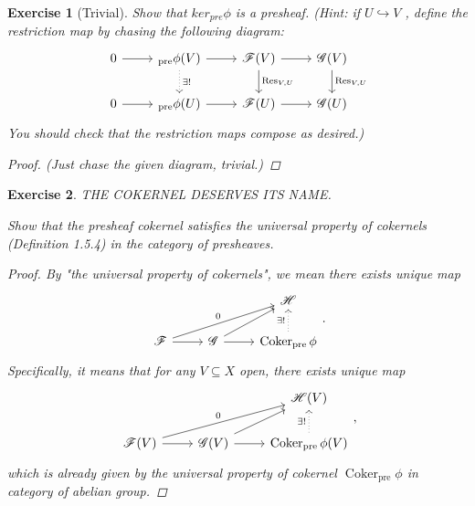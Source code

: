 \documentclass{article}
\theoremstyle{breakstyle}
\newtheorem{exercise}{Exercise}[section]
\DeclareMathOperator{\coker}{Coker}
\let\ker\relax
\DeclareMathOperator{\ker}{Ker}
\DeclareMathOperator{\res}{Res}
\DeclareMathOperator{\pre}{pre}
\begin{document}
\begin{exercise}[Trivial]
Show that $ker_{pre} \phi$ is a presheaf. (Hint: if $U \hookrightarrow V$ ,
define the restriction map by chasing the following diagram:
$$
\begin{tikzcd}
0 \arrow[r] & \ker_{\pre}{\phi(V)} \arrow[r] \arrow[d, "\exists!", dotted] & \mathscr{F}(V) \arrow[r] \arrow[d, "{\res_{V,U}}"] & \mathscr{G}(V) \arrow[d, "{\res_{V,U}}"] \\
0 \arrow[r] & \ker_{\pre}{\phi(U)} \arrow[r]                               & \mathscr{F}(U) \arrow[r]                           & \mathscr{G}(U)                          
\end{tikzcd}
$$
You should check that the restriction maps compose as desired.)

\begin{proof}
    \emph{(Just chase the given diagram, trivial.)}
\end{proof}

\end{exercise}

\begin{exercise}
THE COKERNEL DESERVES ITS NAME.

Show that the presheaf cokernel satisfies the universal property of cokernels
(Definition 1.5.4) in the category of presheaves.

\begin{proof}
    By "the universal property of cokernels", we mean there exists unique map
    $$
    \begin{tikzcd}
                                           &                                  & \mathscr{H}                                       \\
    \mathscr{F} \arrow[r] \arrow[rru, "0"] & \mathscr{G} \arrow[r] \arrow[ru] & \coker_{\pre}{\phi} \arrow[u, "\exists!", dotted]
    \end{tikzcd}
    .$$
    Specifically, it means that for any $V\subseteq X$ open, there exists unique
    map
    $$
    \begin{tikzcd}
                                              &                                     & \mathscr{H}(V)                                       \\
    \mathscr{F}(V) \arrow[r] \arrow[rru, "0"] & \mathscr{G}(V) \arrow[r] \arrow[ru] & \coker_{\pre}{\phi(V)} \arrow[u, "\exists!", dotted]
    \end{tikzcd}
    ,$$
    which is already given by the universal property of cokernel
    $\coker_{\pre}{\phi}$ in category of abelian group.
\end{proof}

\end{exercise}
\end{document}
